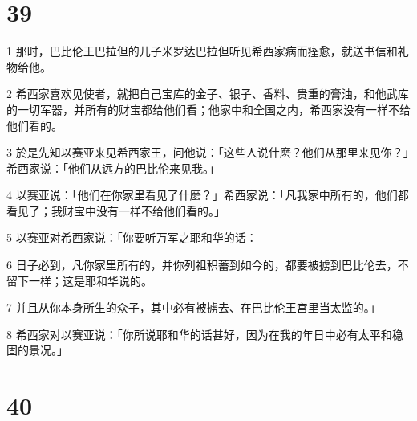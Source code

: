 \chapter{39}

\par 1 那时，巴比伦王巴拉但的儿子米罗达巴拉但听见希西家病而痊愈，就送书信和礼物给他。
\par 2 希西家喜欢见使者，就把自己宝库的金子、银子、香料、贵重的膏油，和他武库的一切军器，并所有的财宝都给他们看；他家中和全国之内，希西家没有一样不给他们看的。
\par 3 於是先知以赛亚来见希西家王，问他说：「这些人说什麽？他们从那里来见你？」希西家说：「他们从远方的巴比伦来见我。」
\par 4 以赛亚说：「他们在你家里看见了什麽？」希西家说：「凡我家中所有的，他们都看见了；我财宝中没有一样不给他们看的。」
\par 5 以赛亚对希西家说：「你要听万军之耶和华的话：
\par 6 日子必到，凡你家里所有的，并你列祖积蓄到如今的，都要被掳到巴比伦去，不留下一样；这是耶和华说的。
\par 7 并且从你本身所生的众子，其中必有被掳去、在巴比伦王宫里当太监的。」
\par 8 希西家对以赛亚说：「你所说耶和华的话甚好，因为在我的年日中必有太平和稳固的景况。」

\chapter{40}

